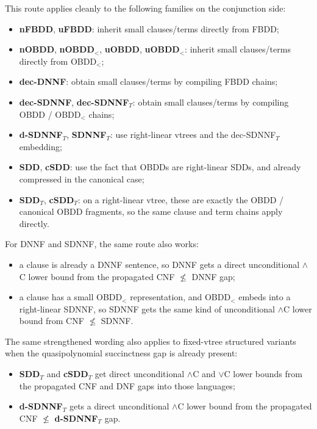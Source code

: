 \documentclass[11pt]{article}
\newcommand{\langref}[1]{\textbf{#1}}
\newcommand{\langfam}[2]{\textbf{#1$_{#2}$}}
\begin{document}
This route applies cleanly to the following families on the conjunction side:
\begin{itemize}[noitemsep]
  \item \langref{nFBDD}, \langref{uFBDD}: inherit small clauses/terms directly from FBDD;
  \item \langref{nOBDD}, \langfam{nOBDD}{<}, \langref{uOBDD}, \langfam{uOBDD}{<}: inherit small clauses/terms directly from OBDD$_<$;
  \item \langref{dec-DNNF}: obtain small clauses/terms by compiling FBDD chains;
  \item \langref{dec-SDNNF}, \langfam{dec-SDNNF}{T}: obtain small clauses/terms by compiling OBDD / OBDD$_<$ chains;
  \item \langfam{d-SDNNF}{T}, \langfam{SDNNF}{T}: use right-linear vtrees and the dec-SDNNF$_T$ embedding;
  \item \langref{SDD}, \langref{cSDD}: use the fact that OBDDs are right-linear SDDs, and already compressed in the canonical case;
  \item \langfam{SDD}{T}, \langfam{cSDD}{T}: on a right-linear vtree, these are exactly the OBDD / canonical OBDD fragments, so the same clause and term chains apply directly.
\end{itemize}

For DNNF and SDNNF, the same route also works:
\begin{itemize}[noitemsep]
  \item a clause is already a DNNF sentence, so DNNF gets a direct unconditional $\land$C lower bound from the propagated CNF $\not\leq$ DNNF gap;
  \item a clause has a small OBDD$_<$ representation, and OBDD$_<$ embeds into a right-linear SDNNF, so SDNNF gets the same kind of unconditional $\land$C lower bound from CNF $\not\leq$ SDNNF.
\end{itemize}

The same strengthened wording also applies to fixed-vtree structured variants when the quasipolynomial succinctness gap is already present:
\begin{itemize}[noitemsep]
  \item \langfam{SDD}{T} and \langfam{cSDD}{T} get direct unconditional $\land$C and $\lor$C lower bounds from the propagated CNF and DNF gaps into those languages;
  \item \langfam{d-SDNNF}{T} gets a direct unconditional $\land$C lower bound from the propagated CNF $\not\leq$ \langfam{d-SDNNF}{T} gap.
\end{itemize}
\end{document}
